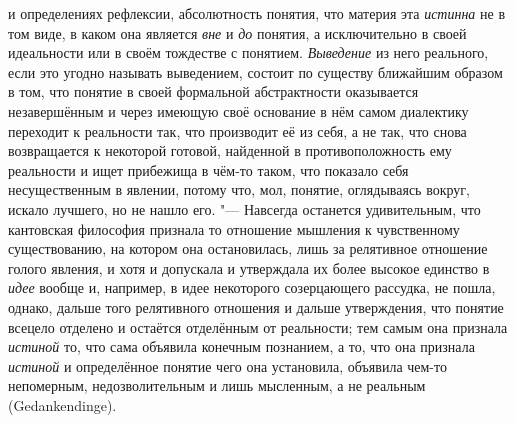 и определениях рефлексии, абсолютность понятия, что материя эта
{\em истинна} не в том
виде, в каком она является {\em вне}
и {\em до}
понятия, а исключительно в своей идеальности или в своём
тождестве с понятием. {\em Выведение}
из него реального, если это угодно называть выведением,
состоит по существу ближайшим образом в том, что понятие в своей формальной
абстрактности оказывается незавершённым и через имеющую своё основание в
нём самом диалектику переходит к реальности так, что производит её из себя,
а не так, что снова возвращается к некоторой готовой, найденной в
противоположность ему реальности и ищет прибежища в чём-то таком, что
показало себя несущественным в явлении, потому что, мол,
понятие, оглядываясь вокруг, искало лучшего, но не нашло
его. "--- Навсегда останется удивительным, что кантовская
философия признала то отношение мышления к чувственному существованию, на
котором она остановилась, лишь за релятивное отношение голого явления, и
хотя и допускала и утверждала их более высокое единство в
{\em идее} вообще и,
например, в идее некоторого созерцающего рассудка, не пошла, однако, дальше
того релятивного отношения и дальше утверждения, что понятие всецело
отделено и остаётся отделённым от реальности; тем самым она признала
{\em истиной} то, что
сама объявила конечным познанием, а то, что она признала
{\em истиной} и
определённое понятие чего она установила, объявила чем-то непомерным,
недозволительным и лишь мысленным, а не реальным (Gedan\-kendin\-ge).

